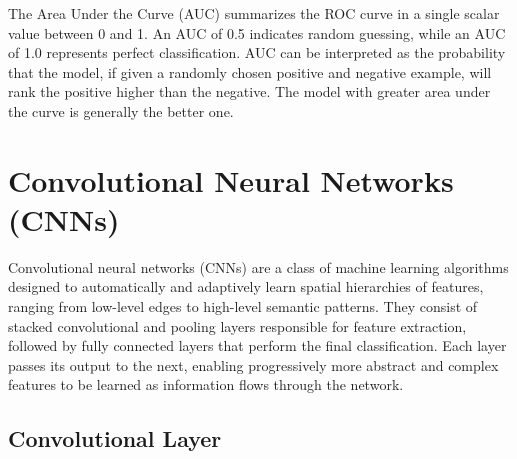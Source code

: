 \documentclass{pracalicmgr}
\begin{document}
The Area Under the Curve (AUC) summarizes the ROC curve in a single scalar value between 0 and 1. An AUC of 0.5 indicates random guessing, while an AUC of 1.0 represents perfect classification. AUC can be interpreted as the probability that the model, if given a randomly chosen positive and negative example, will rank the positive higher than the negative. The model with greater area under the curve is generally the better one.

\section{Convolutional Neural Networks (CNNs)}


Convolutional neural networks (CNNs) are a class of machine learning algorithms designed to automatically and adaptively learn spatial hierarchies of features, ranging from low-level edges to high-level semantic patterns. They consist of stacked convolutional and pooling layers responsible for feature extraction, followed by fully connected layers that perform the final classification. Each layer passes its output to the next, enabling progressively more abstract and complex features to be learned as information flows through the network.

\subsection{Convolutional Layer}
\end{document}
